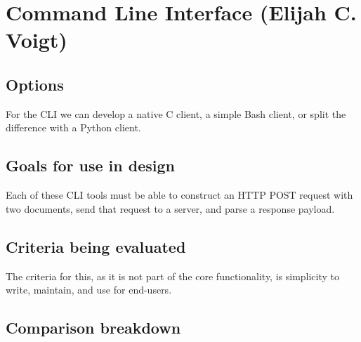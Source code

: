 \section{Command Line Interface (Elijah C. Voigt)}

\subsection{Options}

For the CLI we can develop a native C client, a simple Bash client, or split the difference with a Python client.

\subsection{Goals for use in design}

Each of these CLI tools must be able to construct an HTTP POST request with two documents, send that request to a server, and parse a response payload.

\subsection{Criteria being evaluated}

The criteria for this, as it is not part of the core functionality, is simplicity to write, maintain, and use for end-users.

\subsection{Comparison breakdown}

